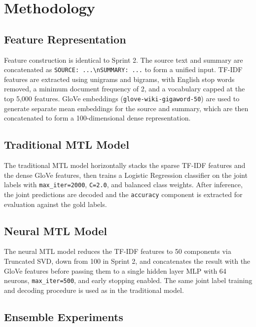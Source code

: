 \documentclass[11pt,twocolumn]{article}
\begin{document}
\section{Methodology}

\subsection{Feature Representation}

Feature construction is identical to Sprint 2. The source text and summary are
concatenated as \texttt{SOURCE: ...\textbackslash nSUMMARY: ...} to form a
unified input. TF-IDF features are extracted using unigrams and bigrams, with
English stop words removed, a minimum document frequency of 2, and a vocabulary
capped at the top 5,000 features. GloVe embeddings
(\texttt{glove-wiki-gigaword-50}) are used to generate separate mean embeddings
for the source and summary, which are then concatenated to form a 100-dimensional
dense representation.

\subsection{Traditional MTL Model}

The traditional MTL model horizontally stacks the sparse TF-IDF features and
the dense GloVe features, then trains a Logistic Regression classifier on the
joint labels with \texttt{max\_iter=2000}, \texttt{C=2.0}, and balanced class
weights. After inference, the joint predictions are decoded and the
\texttt{accuracy} component is extracted for evaluation against the gold labels.

\subsection{Neural MTL Model}

The neural MTL model reduces the TF-IDF features to 50 components via
Truncated SVD, down from 100 in Sprint 2, and concatenates the result with the
GloVe features before passing them to a single hidden layer MLP with 64 neurons,
\texttt{max\_iter=500}, and early stopping enabled. The same joint label
training and decoding procedure is used as in the traditional model.

\subsection{Ensemble Experiments}
\end{document}
